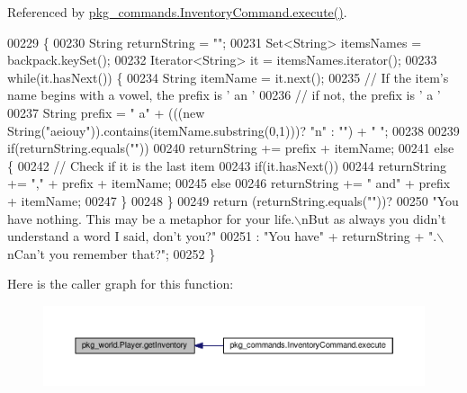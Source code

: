 Referenced by \hyperlink{InventoryCommand_8java_source_l00023}{pkg\-\_\-commands.\-Inventory\-Command.\-execute()}.


\begin{DoxyCode}
00229                                  \{
00230         String returnString = \textcolor{stringliteral}{""};
00231         Set<String> itemsNames = backpack.keySet();
00232         Iterator<String> it = itemsNames.iterator();
00233         \textcolor{keywordflow}{while}(it.hasNext()) \{
00234             String itemName = it.next();
00235             \textcolor{comment}{// If the item's name begins with a vowel, the prefix is ' an '}
00236             \textcolor{comment}{// if not, the prefix is ' a '}
00237             String prefix = \textcolor{stringliteral}{" a"} + (((\textcolor{keyword}{new} String(\textcolor{stringliteral}{"aeiouy"})).contains(itemName.substring(0,1)))? \textcolor{stringliteral}{"n"} : \textcolor{stringliteral}{""}) +
       \textcolor{stringliteral}{" "};
00238 
00239             \textcolor{keywordflow}{if}(returnString.equals(\textcolor{stringliteral}{""}))
00240                 returnString += prefix + itemName;
00241             \textcolor{keywordflow}{else} \{
00242                 \textcolor{comment}{// Check if it is the last item}
00243                 \textcolor{keywordflow}{if}(it.hasNext())
00244                     returnString += \textcolor{stringliteral}{","} + prefix + itemName;
00245                 \textcolor{keywordflow}{else}
00246                     returnString += \textcolor{stringliteral}{" and"} + prefix + itemName;
00247             \}
00248         \}
00249         \textcolor{keywordflow}{return} (returnString.equals(\textcolor{stringliteral}{""}))?
00250             \textcolor{stringliteral}{"You have nothing. This may be a metaphor for your life.\(\backslash\)nBut as always you didn't understand a
       word I said, don't you?"}
00251             : \textcolor{stringliteral}{"You have"} + returnString + \textcolor{stringliteral}{".\(\backslash\)nCan't you remember that?"};
00252     \}
\end{DoxyCode}


Here is the caller graph for this function\-:
\nopagebreak
\begin{figure}[H]
\begin{center}
\leavevmode
\includegraphics[width=350pt]{classpkg__world_1_1Player_a2a6e491f41e159bbac42022e55df2d52_icgraph}
\end{center}
\end{figure}


